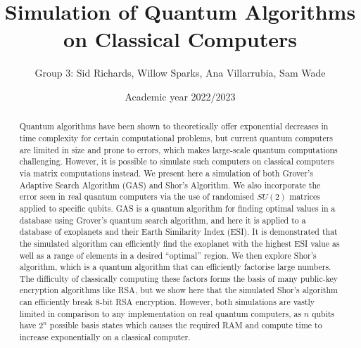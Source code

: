 \documentclass{article}[11pt]
\title{\textbf{Simulation of Quantum Algorithms on Classical Computers}}
\author{Group 3: Sid Richards, Willow Sparks, Ana Villarrubia, Sam Wade}
\date{Academic year 2022/2023}
\begin{document}
\begin{titlepage}
\begin{figure}
\end{figure}
\maketitle
\begin{abstract}
Quantum algorithms have been shown to theoretically offer exponential decreases in time complexity for certain computational problems, but current quantum computers are limited in size and prone to errors, which makes large-scale quantum computations challenging. However, it is possible to simulate such computers on classical computers via matrix computations instead. We present here a simulation of both Grover's Adaptive Search Algorithm (GAS) and Shor's Algorithm. We also incorporate the error seen in real quantum computers via the use of randomised $SU(2)$ matrices applied to specific qubits. GAS is a quantum algorithm for finding optimal values in a database using Grover's quantum search algorithm, and here it is applied to a database of exoplanets and their Earth Similarity Index (ESI). It is demonstrated that the simulated algorithm can efficiently find the exoplanet with the highest ESI value as well as a range of elements in a desired ``optimal'' region. We then explore Shor's algorithm, which is a quantum algorithm that can efficiently factorise large numbers. The difficulty of classically computing these factors forms the basis of many public-key encryption algorithms like RSA, but we show here that the simulated Shor's algorithm can efficiently break 8-bit RSA encryption. However, both simulations are vastly limited in comparison to any implementation on real quantum computers, as $n$ qubits have $2^n$ possible basis states which causes the required RAM and compute time to increase exponentially on a classical computer.
\end{abstract}

\end{titlepage}
\end{document}
